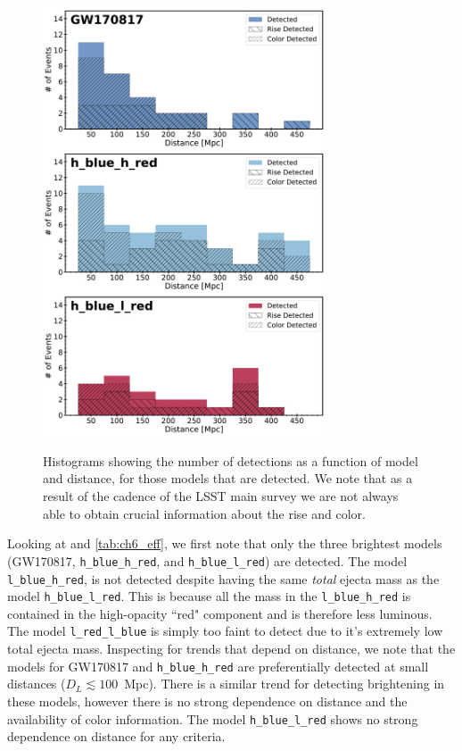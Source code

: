 \begin{figure}[!t]
\begin{center}
\hspace*{-0.1in}
\scalebox{1.}
{\includegraphics[width=0.75\textwidth]{./figs/chapter6/f1.pdf}}
\caption{\singlespace Histograms showing the number of detections as a function of model and distance, for those models that are detected. We note that as a result of the cadence of the LSST main survey we are not always able to obtain crucial information about the rise and color.}
\label{fig:ch6_eff_hist}
\end{center}
\end{figure}

\clearpage
Looking at  and \cref{tab:ch6_eff}, we first note that only the three brightest models (GW170817, {\tt h\_blue\_h\_red}, and {\tt h\_blue\_l\_red}) are detected. The model {\tt l\_blue\_h\_red}, is not detected despite having the same {\it total} ejecta mass as the model {\tt h\_blue\_l\_red}. This is because all the mass in the {\tt l\_blue\_h\_red} is contained in the high-opacity ``red" component and is therefore less luminous. The model {\tt l\_red\_l\_blue} is simply too faint to detect due to it's extremely low total ejecta mass.  Inspecting  for trends that depend on distance, we note that the models for GW170817 and {\tt h\_blue\_h\_red} are preferentially detected at small distances ($D_L \lesssim 100$~Mpc). There is a similar trend for detecting brightening in these models, however there is no strong dependence on distance and the availability of color information. The model {\tt h\_blue\_l\_red} shows no strong dependence on distance for any criteria.

